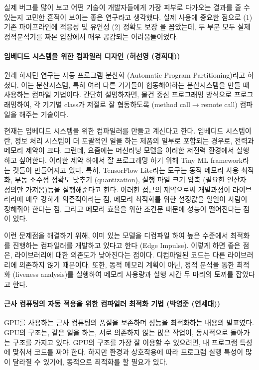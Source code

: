 \documentclass{article}
\begin{document}
실제 버그를 많이 보고 어떤 기술이 개발자들에게 가장 피부로 다가오는 결과를 줄 수 있는지 고민한 흔적이 보이는 좋은 연구라고 생각했다.
실제 사용에 중요한 점으로 (1) 기존 파이프라인에 적응성 및 유연성 (2) 정확도 보장 을 꼽았는데, 두 부분 모두 실제 정적분석기를 짜본 입장에서 매우 공감되는 어려움들이었다.
\paragraph{임베디드 시스템을 위한 컴파일러 디자인 (허선영 (경희대))}
원래 하시던 연구는 자동 프로그램 분산화 (Automatic Program Partitioning)라고 하셨다.
이는 분산시스템, 특히 여러 다른 기기들이 협동해야하는 분산시스템을 만들 때 사용하는 컴파일 기법이다.
간단히 설명하자면, 물건 중심 프로그래밍 방식으로 프로그래밍하여, 각 기기별 class가 저절로 잘 협동하도록 (method call$\rightarrow$remote call) 컴파일을 해주는 기술이다.

현재는 임베디드 시스템을 위한 컴파일러를 만들고 계신다고 한다.
임베디드 시스템이란, 정보 처리 시스템이 더 포괄적인 일을 하는 제품의 일부로 포함되는 경우로, 전력과 메모리 제약이 크다.
그런데, 요즘에는 머신러닝 모델을 이러한 저전력 환경에서 실행하고 싶어한다.
이러한 제약 하에서 잘 프로그래밍 하기 위해 Tiny ML framework라는 것들이 만들어지고 있다.
특히, TensorFlow Lite라는 도구는 동적 메모리 사용 최적화, 부동 소수점 정확도 낮추기 (quantization), 실행 파일 크기 압축 (필요한 연산자 정의만 가져옴)등을 실행해준다고 한다.
이러한 접근의 제약으로써 개발과정이 라이브러리에 매우 강하게 의존적이라는 점, 메모리 최적화를 위한 설정값을 일일이 사람이 정해줘야 한다는 점, 그리고 메모리 효율을 위한 조건문 때문에 성능이 떨어진다는 점이 있다.

이런 문제점을 해결하기 위해, 이미 있는 모델을 디컴파일 하여 높은 수준에서 최적화를 진행하는 컴파일러를 개발하고 있다고 한다 (Edge Impulse).
이렇게 하면 좋은 점은, 라이브러리에 대한 의존도가 낮아진다는 점이다.
디컴파일된 코드는 다른 라이브러리에 의존하지 않기 때문이다.
또한, 동적 메모리 계획이 아닌, 정적 분석을 통한 최적화 (liveness analysis)를 실행하여 메모리 사용량과 실행 시간 두 마리의 토끼를 잡았다고 한다.
\paragraph{근사 컴퓨팅의 자동 적용을 위한 컴파일러 최적화 기법 (박영준 (연세대))}
GPU를 사용하는 근사 컴퓨팅의 품질을 보존하며 성능을 최적화하는 내용의 발표였다.
GPU의 구조는, 같은 일을 하는, 서로 의존하지 않는 많은 작업이, 동시적으로 돌아가는 구조를 가지고 있다.
GPU의 구조를 가장 잘 이용할 수 있으려면, 내 프로그램 특성에 맞춰서 코드를 짜야 한다.
하지만 환경과 상호작용에 따라 프로그램 실행 특성이 많이 달라질 수 있기에, 동적으로 최적화를 할 필요가 있다.
\end{document}
